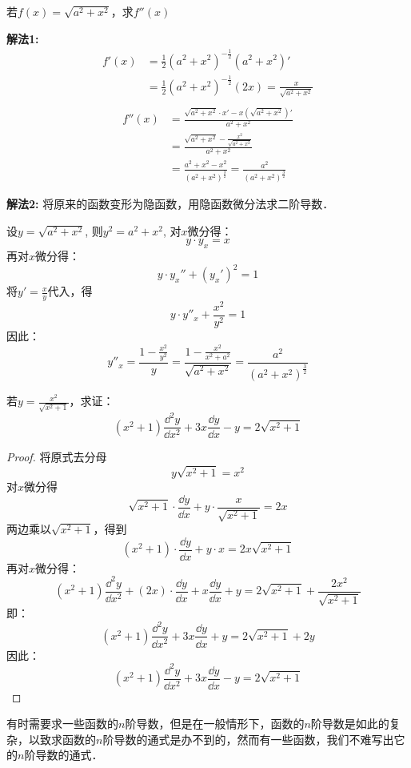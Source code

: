 \begin{example}
若$f(x)=\sqrt{a^2+x^2}$，求$f''(x)$
\end{example}


\begin{solution}
\textbf{解法1: }
\begin{align*}
    f'(x)&=\frac{1}{2}(a^2+x^2)^{-\tfrac{1}{2}}(a^2+x^2)'\\
    &=\frac{1}{2}(a^2+x^2)^{-\tfrac{1}{2}}(2x)=\frac{x}{\sqrt{a^2+x^2}}\\
\end{align*}
\begin{align*}
f''(x)&=\frac{\sqrt{a^2+x^2}\cdot x'-x\left(\sqrt{a^2+x^2}\right)'}{a^2+x^2}\\
&=\frac{\sqrt{a^2+x^2}-\frac{x^2}{\sqrt{a^2+x^2}}}{{a^2+x^2}}\\
&=\frac{a^2+x^2-x^2}{(a^2+x^2)^{\tfrac{3}{2}}}=\frac{a^2}{(a^2+x^2)^{\tfrac{3}{2}}}
\end{align*}

\textbf{解法2: } 将原来的函数变形为隐函数，用隐函数微分法求二阶导数．

设$y=\sqrt{a^2+x^2}$, 则$y^2=a^2+x^2$, 对$x$微分得：
\[y\cdot y_x=x\]    
再对$x$微分得：
\[y\cdot y_x''+(y_x')^2=1\]
将$y'=\frac{x}{y}$代入，得
\[y\cdot y''_x+\frac{x^2}{y^2}=1\]
因此：
\[y''_x=\frac{1-\frac{x^2}{y^2}}{y}=\frac{1-\frac{x^2}{x^2+a^2}}{\sqrt{a^2+x^2}}=\frac{a^2}{(a^2+x^2)^{\tfrac{3}{2}}}\]
\end{solution}

\begin{example}
    若$y=\frac{x^2}{\sqrt{x^2+1}}$，求证：
\[(x^2+1)\frac{\dd^2 y}{\dd x^2}+3x\frac{\dd y}{\dd x}-y=2\sqrt{x^2+1}\]
\end{example}

\begin{proof}
将原式去分母
\[y\sqrt{x^2+1}=x^2\]
对$x$微分得
\[\sqrt{x^2+1}\cdot\frac{\dd y}{\dd x}+y\cdot \frac{x}{\sqrt{x^2+1}}=2x\]
两边乘以$\sqrt{x^2+1}$，得到
\[(x^2+1)\cdot \frac{\dd y}{\dd x}+y\cdot x=2x\sqrt{x^2+1}\]
再对$x$微分得：
\[(x^2+1)\frac{\dd^2 y}{\dd x^2}+(2x)\cdot \frac{\dd y}{\dd x}+x\frac{\dd y}{\dd x}+y=2\sqrt{x^2+1}+\frac{2x^2}{\sqrt{x^2+1}}\]
即：
\[(x^2+1)\frac{\dd^2 y}{\dd x^2}+3x\frac{\dd y}{\dd x}+y=2\sqrt{x^2+1}+2y\]
因此：
\[(x^2+1)\frac{\dd^2 y}{\dd x^2}+3x\frac{\dd y}{\dd x}-y=2\sqrt{x^2+1}\]
\end{proof}

有时需要求一些函数的$n$阶导数，但是在一般情形下，函数的$n$阶导数是如此的复杂，以致求函数的$n$阶导数的通式是办不到的，然而有一些函数，我们不难写出它的$n$阶导数的通式．

